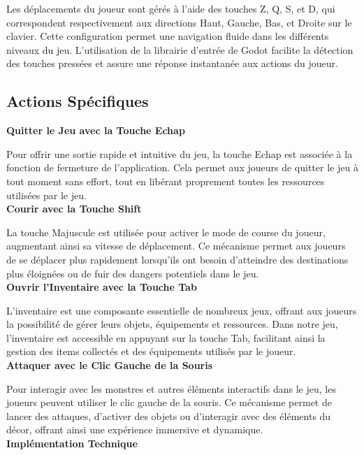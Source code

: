       Les déplacements du joueur sont gérés à l'aide des touches Z, Q, S, et D, qui correspondent respectivement aux directions Haut, Gauche, Bas, et Droite sur le clavier. 
      Cette configuration permet une navigation fluide dans les différents niveaux du jeu. 
      L'utilisation de la librairie d'entrée de Godot facilite la détection des touches pressées et assure une réponse instantanée aux actions du joueur.

      \subsection*{Actions Spécifiques}
      \textbf{Quitter le Jeu avec la Touche Echap}

      Pour offrir une sortie rapide et intuitive du jeu, la touche Echap est associée à la fonction de fermeture de l'application. 
      Cela permet aux joueurs de quitter le jeu à tout moment sans effort, tout en libérant proprement toutes les ressources utilisées par le jeu.
      \\

      \textbf{Courir avec la Touche Shift}

      La touche Majuscule est utilisée pour activer le mode de course du joueur, augmentant ainsi sa vitesse de déplacement. Ce mécanisme permet aux joueurs de se déplacer plus rapidement lorsqu'ils ont besoin d'atteindre des destinations plus éloignées ou de fuir des dangers potentiels dans le jeu.
      \\

      \textbf{Ouvrir l'Inventaire avec la Touche Tab}

      L'inventaire est une composante essentielle de nombreux jeux, offrant aux joueurs la possibilité de gérer leurs objets, équipements et ressources. Dans notre jeu, l'inventaire est accessible en appuyant sur la touche Tab, facilitant ainsi la gestion des items collectés et des équipements utilisés par le joueur.
      \\

      \textbf{Attaquer avec le Clic Gauche de la Souris}

      Pour interagir avec les monstres et autres éléments interactifs dans le jeu, les joueurs peuvent utiliser le clic gauche de la souris. Ce mécanisme permet de lancer des attaques, d'activer des objets ou d'interagir avec des éléments du décor, offrant ainsi une expérience immersive et dynamique.
      \\

      \textbf{Implémentation Technique}

